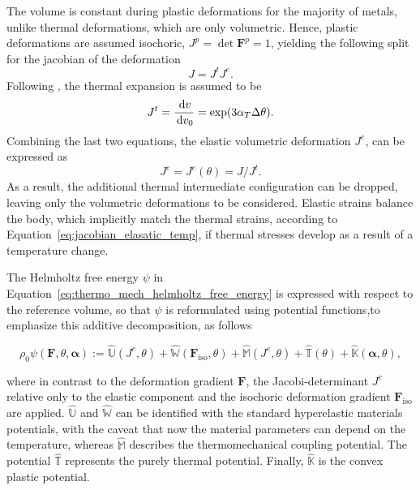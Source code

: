 The volume is constant during plastic deformations for the majority of metals, unlike thermal deformations, which are only volumetric.
Hence, plastic deformations are assumed isochoric, \(J^p = \operatorname{det}\bm F^p=1\), yielding the following split for the jacobian of the deformation
\begin{equation}
  J = J^t J^e.
\end{equation}
Following \cite{danowski_computational_2014}, the thermal expansion is assumed to be
\begin{equation}
  J^t = \frac{\,\mathrm{d} v}{\,\mathrm{d} v_0} = \operatorname{exp}(3\alpha_T \Delta\theta).
\end{equation}
Combining the last two equations, the elastic volumetric deformation \(J^e\), can be expressed as
\begin{equation} \label{eq:jacobian_elasatic_temp}
  J^e  = J^e(\theta) = J/J^t.
\end{equation}
As a result, the additional thermal intermediate configuration can be dropped, leaving only the volumetric deformations to be considered.
Elastic strains balance the body, which implicitly match the thermal strains, according to Equation~\eqref{eq:jacobian_elasatic_temp}, if thermal stresses develop as a result of a temperature change.

The Helmholtz free energy \(\psi\) in Equation~\ref{eq:thermo_mech_helmholtz_free_energy} is expressed with respect to the reference volume, so that \(\psi\) is reformulated using potential functions,to emphasize this additive decomposition, as follows
  \begin{highlight}
    \begin{equation}
    \rho_{0} \psi\left(\bm{F}, \theta, \bm{\alpha}\right):=\hat{\mathbb{U}}\left(J^e,\theta\right)+\hat{\mathbb{W}}(\bm{F}_\text{iso},\theta)+\hat{\mathbb{M}}\left(J^e, \theta\right)+\hat{\mathbb{T}}(\theta)+\hat{\mathbb{K}}\left(\boldsymbol{\alpha}, \theta\right),
    \end{equation}
  \end{highlight}
  where in contrast to the deformation gradient \(\bm{F}\), the Jacobi-determinant \(J^{e}\) relative only to the elastic component and the isochoric deformation gradient \(\bm{F}_\text{iso}\) are applied.
  \(\hat{\mathbb U}\) and \(\hat{\mathbb{W}}\) can be identified with the standard hyperelastic materials potentials, with the caveat that now the material parameters can depend on the temperature, whereas
  \(\hat{\mathbb M}\) describes the thermomechanical coupling potential.
  The potential \(\hat{\mathbb{T}}\) represents the purely thermal potential.
  Finally, \(\hat{\mathbb{K}}\) is the convex plastic potential.

